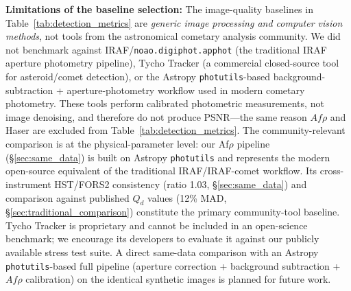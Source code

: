 \documentclass[usenatbib]{mnras}
\begin{document}
\textbf{Limitations of the baseline selection:} The image-quality baselines in Table~\ref{tab:detection_metrics} are \textit{generic image processing and computer vision methods}, not tools from the astronomical cometary analysis community. We did not benchmark against IRAF/\texttt{noao.digiphot.apphot} (the traditional IRAF aperture photometry pipeline), Tycho Tracker (a commercial closed-source tool for asteroid/comet detection), or the Astropy \texttt{photutils}-based background-subtraction + aperture-photometry workflow used in modern cometary photometry. These tools perform calibrated photometric measurements, not image denoising, and therefore do not produce PSNR---the same reason $Af\rho$ and Haser are excluded from Table~\ref{tab:detection_metrics}. The community-relevant comparison is at the physical-parameter level: our Af$\rho$ pipeline (\S\ref{sec:same_data}) is built on Astropy \texttt{photutils} and represents the modern open-source equivalent of the traditional IRAF/IRAF-comet workflow. Its cross-instrument HST/FORS2 consistency (ratio 1.03, \S\ref{sec:same_data}) and comparison against published $Q_d$ values (12\% MAD, \S\ref{sec:traditional_comparison}) constitute the primary community-tool baseline. Tycho Tracker is proprietary and cannot be included in an open-science benchmark; we encourage its developers to evaluate it against our publicly available stress test suite. A direct same-data comparison with an Astropy \texttt{photutils}-based full pipeline (aperture correction + background subtraction + $Af\rho$ calibration) on the identical synthetic images is planned for future work.
\end{document}
